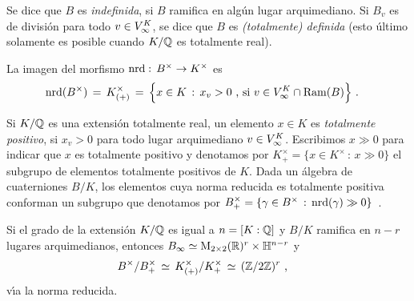 Se dice que $B$ es \emph{indefinida}, si $B$ ramifica en alg\'{u}n lugar
arquimediano. Si $B_{v}$ es de divisi\'{o}n para todo
$v\in\lugares[\infty]{K}$, se dice que $B$ es \emph{(totalmente) definida}
(esto \'{u}ltimo solamente es posible cuando $K/\bb{Q}$ es totalmente real).
%
\begin{teoEichlerNorma}%
	\label{thm:eichlernorma}
	La imagen del morfismo $\nrd:\,B^{\times}\rightarrow K^{\times}$ es
	\begin{align*}
		\nrd(B^{\times}) & \,=\, K_{(+)}^{\times}\,=\,
			\Big\{x\in K\,:\,x_{v}>0\text{ , si }
				v\in\lugares[\infty]{K}\cap\Ram(B)\Big\}
		\text{ .}
	\end{align*}
\end{teoEichlerNorma}


Si $K/\bb{Q}$ es una extensi\'{o}n totalmente real, un elemento $x\in K$ es
\emph{totalmente positivo}, si $x_{v}>0$ para todo lugar arquimediano
$v\in\lugares[\infty]{K}$. Escribimos $x\gg 0$ para indicar que $x$ es
totalmente positivo y denotamos por
\begin{math}
	K_{+}^{\times}=\{x\in K^{\times}\,:\, x \gg 0\}
\end{math}
el subgrupo de elementos totalmente positivos de $K$. Dada un \'{a}lgebra de
cuaterniones $B/K$, los elementos cuya norma reducida es totalmente positiva
conforman un subgrupo que denotamos por
\begin{math}
	B_{+}^{\times}=\{\gamma\in B^{\times}\,:\,
		\nrd(\gamma)\gg 0\}
\end{math}~.

\begin{obsEichlerNorma}\label{obs:eichlernorma}
	Si el grado de la extensi\'{o}n $K/\bb{Q}$ es igual a $n=[K:\bb{Q}]$ y
	$B/K$ ramifica en $n-r$ lugares arquimedianos, entonces
	\begin{math}
		B_{\infty}\simeq
			\MM_{2\times 2}(\bb{R})^{r}\times\bb{H}^{n-r}
	\end{math}
	y
	\begin{align*}
		B^{\times}/B_{+}^{\times} & \,\simeq\,
			K_{(+)}^{\times}/K_{+}^{\times} \,\simeq\,
			(\bb{Z}/2\bb{Z})^{r}
		\text{ ,}
	\end{align*}
	v\'{\i}a la norma reducida.
\end{obsEichlerNorma}

